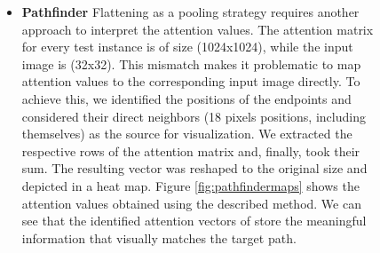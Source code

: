 \documentclass{article}
\begin{document}
\begin{figure}[t]
\begin{center}
\begin{itemize}
    \item \textbf{Pathfinder} 
    Flattening as a pooling strategy requires another approach to interpret the attention values. The attention matrix  for every test instance is of size (1024x1024), while the input image is (32x32). This mismatch makes it problematic to map attention values to the corresponding input image directly. To achieve this, we identified the positions of the endpoints and considered their direct neighbors (18 pixels positions, including themselves) as the source for visualization. We extracted the respective rows of the attention matrix and, finally, took their sum. The resulting vector was reshaped to the original size and depicted in a heat map. Figure \ref{fig:pathfindermaps} shows the attention values obtained using the described method. We can see that the identified attention vectors of  store the meaningful information that visually matches the target path. 
\end{itemize}



\end{center}
\end{figure}
\end{document}
